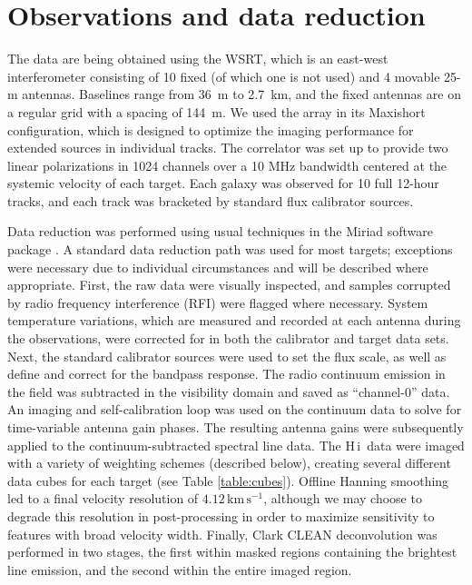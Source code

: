 \documentclass[oldversion]{aa}
\newcommand{\HI}{{\sc H\,i}}
\begin{document}
\section{Observations and data reduction}\label{section:observations}

The data are being obtained using the WSRT, which is an east-west interferometer consisting of 10 fixed (of which one is not used) and 4 movable 25-m antennas. Baselines range from 36~m to 2.7~km, and the fixed antennas are on a regular grid with a spacing of 144~m. We used the array in its Maxishort configuration, which is designed to optimize the imaging performance for extended sources in individual tracks. The correlator was set up to provide two linear polarizations in 1024 channels over a 10 MHz bandwidth centered at the systemic velocity of each target. Each galaxy was observed for 10 full 12-hour tracks, and each track was bracketed by standard flux calibrator sources.

Data reduction was performed using usual techniques in the Miriad software package \citep{sault_etal_1995}. A standard data reduction path was used for most targets; exceptions were necessary due to individual circumstances and will be described where appropriate. First, the raw data were visually inspected, and samples corrupted by radio frequency interference (RFI) were flagged where necessary. System temperature variations, which are measured and recorded at each antenna during the observations, were corrected for in both the calibrator and target data sets. Next, the standard calibrator sources were used to set the flux scale, as well as define and correct for the bandpass response. The radio continuum emission in the field was subtracted in the visibility domain and saved as ``channel-0'' data. An imaging and self-calibration loop was used on the continuum data to solve for time-variable antenna gain phases. The resulting antenna gains were subsequently applied to the continuum-subtracted spectral line data. The \HI\ data were imaged with a variety of weighting schemes (described below), creating several different data cubes for each target (see Table \ref{table:cubes}). Offline Hanning smoothing led to a final velocity resolution of $4.12\,\mathrm{km\,s^{-1}}$, although we may choose to degrade this resolution in post-processing in order to maximize sensitivity to features with broad velocity width. Finally, Clark CLEAN deconvolution was performed in two stages, the first within masked regions containing the brightest line emission, and the second within the entire imaged region.
\end{document}
